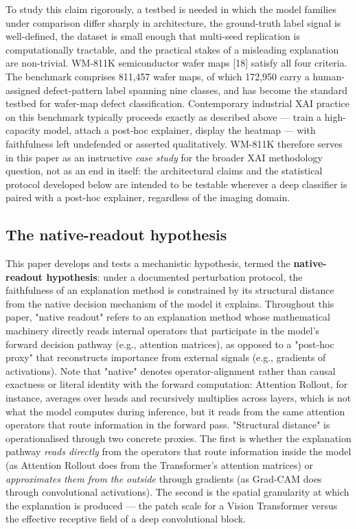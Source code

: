 \documentclass[11pt,a4paper]{article}
\begin{document}
To study this claim rigorously, a testbed is needed in which the model families under comparison differ sharply in architecture, the ground-truth label signal is well-defined, the dataset is small enough that multi-seed replication is computationally tractable, and the practical stakes of a misleading explanation are non-trivial. WM-811K semiconductor wafer maps [18] satisfy all four criteria. The benchmark comprises 811,457 wafer maps, of which 172,950 carry a human-assigned defect-pattern label spanning nine classes, and has become the standard testbed for wafer-map defect classification. Contemporary industrial XAI practice on this benchmark typically proceeds exactly as described above --- train a high-capacity model, attach a post-hoc explainer, display the heatmap --- with faithfulness left undefended or asserted qualitatively. WM-811K therefore serves in this paper as an
instructive \emph{case study} for the broader XAI methodology question, not as an end in itself: the architectural claims and the statistical protocol developed below are intended to be testable wherever a deep classifier is paired with a post-hoc explainer, regardless of the imaging domain.

\subsection{The native-readout hypothesis}

This paper develops and tests a mechanistic hypothesis, termed the \textbf{native-readout hypothesis}: under a documented perturbation protocol, the faithfulness of an explanation method is constrained by its structural distance from the native decision mechanism of the model it explains. Throughout this paper, "native readout" refers to an explanation method whose mathematical machinery directly reads internal operators that participate in the model's forward decision pathway (e.g., attention matrices), as opposed to a "post-hoc proxy" that reconstructs importance from external signals (e.g., gradients of activations). Note that "native" denotes operator-alignment rather than causal exactness or literal identity with the forward computation: Attention Rollout, for instance, averages over heads and recursively multiplies across layers, which is not what the model computes during inference, but it reads from the same attention
operators that route information in the forward pass. "Structural distance" is operationalised through two concrete proxies. The first is whether the explanation pathway \emph{reads directly} from the operators that route information inside the model (as Attention Rollout does from the Transformer's attention matrices) or \emph{approximates them from the outside} through gradients (as Grad-CAM does through convolutional activations). The second is the spatial granularity at which the explanation is produced --- the patch scale for a Vision Transformer versus the effective receptive field of a deep convolutional block.
\end{document}
